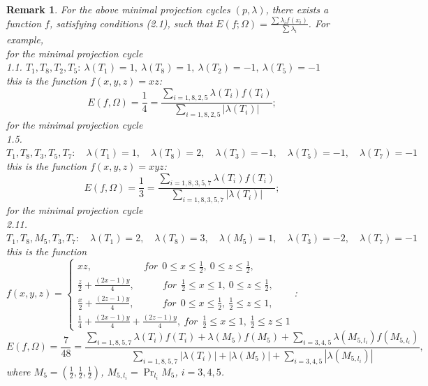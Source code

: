 \documentclass[12p]{article}
\numberwithin{equation}{section}
\newtheorem{remark}{Remark}[section]
\begin{document}
\begin{remark}
    For the above minimal projection cycles $(p,\lambda)$, there exists a function $f$, satisfying conditions (2.1), such that $E(f; \Omega)=\frac{\sum \lambda_i f(x_i)}{\sum \lambda_i}$. For example, \\ for the minimal projection cycle \\    
    1.1. $T_1, T_8, T_2, T_5: \ \lambda(T_1) = 1, \ \lambda(T_8) = 1, \ \lambda(T_2) = -1, \ \lambda(T_5) = -1$ \\
this is the function $f(x,y,z)=xz$:
    \[ E(f, \Omega)=\frac{1}{4}=\frac{\sum_{i=1,8,2,5}\lambda(T_i)f(T_i)}{ \sum_{i=1,8,2,5}|\lambda(T_i)|};\]
for the minimal projection cycle \\    
    1.5. $T_1, T_8, T_3, T_5, T_7:\quad \lambda(T_1) = 1,\quad \lambda(T_8) = 2,\quad \lambda(T_3) = -1,\quad \lambda(T_5) = -1,\quad \lambda(T_7) = -1$ \\
this is the function $f(x,y,z)=xyz$:
    \[ E(f, \Omega)=\frac{1}{3}=\frac{\sum_{i=1,8,3,5,7}\lambda(T_i)f(T_i)}{ \sum_{i=1,8,3,5,7}|\lambda(T_i)|};\]
for the minimal projection cycle \\    
    2.11. $T_1, T_8, M_5, T_3, T_7:\quad \lambda(T_1) = 2,\quad \lambda(T_8) = 3,\quad \lambda(M_5) = 1,\quad \lambda(T_3) = -2,\quad \lambda(T_7) = -1$ \\
this is the function $f(x,y,z)= \begin{cases}
        xz, \ \ \ \ \ \ \ \ \ \ \ \ \ \ \ \ \ \ \ \ \ \ \ \ for \ \  0 \le x \le \frac{1}{2}, \ 0 \le z \le \frac{1}{2}, \\
        \frac{z}{2}+\frac{(2x-1)y}{4}, \ \ \ \ \ \ \ \ \ \ \ \ \ for \ \  \frac{1}{2} \le x \le 1, \ 0 \le z \le \frac{1}{2}, \\
        \frac{x}{2}+\frac{(2z-1)y}{4}, \ \ \ \ \ \ \ \ \ \ \ \ \ for \ \  0 \le x \le \frac{1}{2}, \ \frac{1}{2} \le z \le 1, \\
        \frac{1}{4}+\frac{(2x-1)y}{4}+\frac{(2z-1)y}{4}, \ for \ \  \frac{1}{2} \le x \le 1, \ \frac{1}{2} \le z \le 1
    \end{cases}$:
    \[ E(f, \Omega)=\frac{7}{48}=\frac{\sum_{i=1,8,5,7}\lambda(T_i)f(T_i)+\lambda(M_5)f(M_5)+\sum_{i=3,4,5}\lambda(M_{5,l_i})f(M_{5,l_i})}{ \sum_{i=1,8,5,7}|\lambda(T_i)|+|\lambda(M_5)|+\sum_{i=3,4,5}|\lambda(M_{5,l_i})|},\]
where $M_5=(\frac{1}{2},\frac{1}{2},\frac{1}{2})$, $M_{5,l_i}=\Pr_{l_i}M_5$, $i=3,4,5$.
\end{remark}
\end{document}
